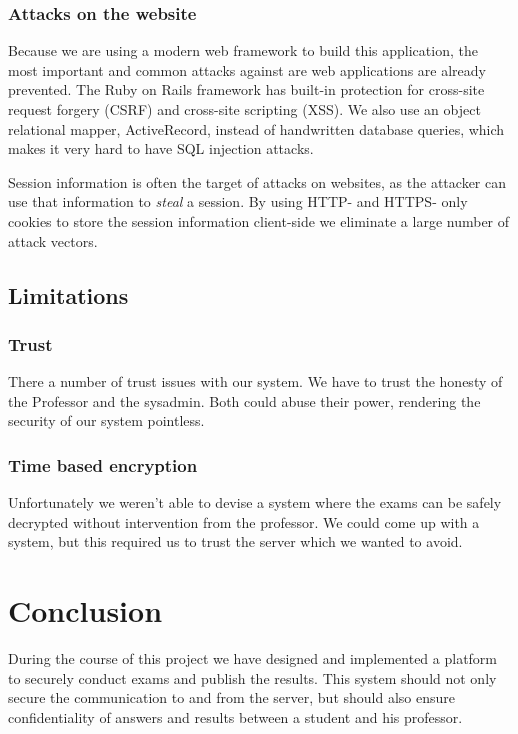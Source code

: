 \documentclass[12pt]{article}
\begin{document}
\subsubsection{Attacks on the website}

Because we are using a modern web framework to build this application, the most
important and common attacks against are web applications are already prevented.
The Ruby on Rails framework has built-in protection for cross-site request
forgery (CSRF) and cross-site scripting (XSS). We also use an object relational
mapper, ActiveRecord, instead of handwritten database queries, which makes it
very hard to have SQL injection attacks.

Session information is often the target of attacks on websites, as the attacker
can use that information to \emph{steal} a session. By using HTTP- and HTTPS-
only cookies to store the session information client-side we eliminate a large
number of attack vectors.

\subsection{Limitations}
\label{subsec:req-limitations}

\subsubsection{Trust}

There a number of trust issues with our system. We have to trust the honesty of
the Professor and the sysadmin. Both could abuse their power, rendering the
security of our system pointless.

\subsubsection{Time based encryption}

Unfortunately we weren't able to devise a system where the exams can be
safely decrypted without intervention from the professor. We could come up with
a system, but this required us to trust the server which we wanted to avoid.

\section{Conclusion}
\label{sec:conclusion}

During the course of this project we have designed and implemented a platform
to securely conduct exams and publish the results. This system should not only
secure the communication to and from the server, but should also ensure
confidentiality of answers and results between a student and his professor.
\end{document}
